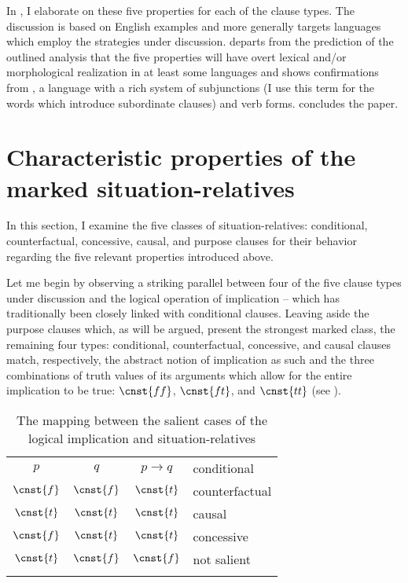 \documentclass[output=paper,
colorlinks,
citecolor=brown,
newtxmath
]{langscibook}
\begin{document}
In , I elaborate on these five properties for each of the clause types. The discussion is based on English examples and more generally targets languages which employ the strategies under discussion.  departs from the prediction of the outlined analysis that the five properties will have overt lexical and/or morphological realization in at least some languages and shows confirmations from , a language with a rich system of subjunctions (I use this term for the words which introduce subordinate clauses) and verb forms.  concludes the paper.


\section{Characteristic properties of the marked situation-relatives}\label{sec:Properties}

In this section, I examine the five classes of situation-relatives: conditional, counterfactual, concessive, causal, and purpose clauses for their behavior regarding the five relevant properties introduced above.

Let me begin by observing a striking parallel between four of the five clause types under discussion and the logical operation of implication -- which has traditionally been closely linked with conditional clauses. Leaving aside the purpose clauses which, as will be argued, present the strongest marked class, the remaining four types: conditional, counterfactual, concessive, and causal clauses match, respectively, the abstract notion of implication as such and the three combinations of truth values of its arguments which allow for the entire implication to be true: $\cnst{ff}$, $\cnst{ft}$, and $\cnst{tt}$ (see ).

\begin{table}
\centering
\begin{tabularx}{.45\textwidth}{cccX}
    \lsptoprule
    $p$ & $q$ & $p\rightarrow q$ & conditional \\
    $\cnst{f}$ & $\cnst{f}$ & $\cnst{t}$ & counterfactual \\
    $\cnst{t}$ & $\cnst{t}$ & $\cnst{t}$ & causal \\
    $\cnst{f}$ & $\cnst{t}$ & $\cnst{t}$ & concessive \\
    \textcolor{lsDOIGray}{$\cnst{t}$} & \textcolor{lsDOIGray}{$\cnst{f}$} & \textcolor{lsDOIGray}{$\cnst{f}$} & not salient\\
    \lspbottomrule
\end{tabularx}
\caption{The mapping between the salient cases of the logical implication and situation-relatives}
\label{tab:Implic}
\end{table}
\end{document}
